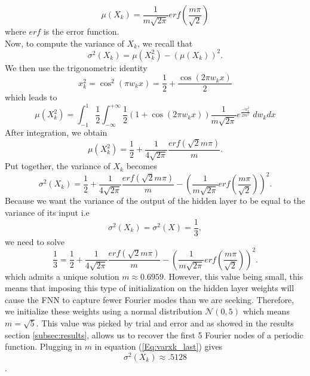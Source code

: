 \documentclass[AMS,STIX1COL]{WileyNJD-v2}
\begin{document}
\begin{enumerate}
\begin{equation}\label{Eq:muxk_last}
    \mu(X_k) = \frac{1}{m\sqrt{2\pi}}erf\left(\frac{m\pi}{\sqrt{2}}\right) 
\end{equation}
where $erf$ is the error function.\\
Now, to compute the variance of $X_k$, we recall that
$$\sigma^2(X_k) = \mu(X_k^2) - (\mu(X_k))^2.$$ 
We then use the trigonometric identity $$x_k^2 = \cos^2(\pi w_k x) = \frac{1}{2} + \frac{\cos(2\pi w_kx)}{2}$$ which leads to
\begin{equation*}
    \mu(X_k^2) = \int_{-1}^{1}\frac{1}{2} \int_{-\infty}^{+\infty} \frac{1}{2}(1 + \cos(2 \pi w_k x))\frac{1}{m \sqrt{2\pi}} e^{\frac{-w_k^2}{2m^2}}\; dw_k dx
\end{equation*}
After integration, we obtain 
$$\mu(X_k^2) = \frac{1}{2} + \frac{1}{4\sqrt{2\pi}}\frac{erf\left(\sqrt{2}m\pi\right)}{m}.$$
Put together, the variance of $X_k$ becomes
\begin{equation}\label{Eq:varxk_last}
    \sigma^2(X_k) = \frac{1}{2} + \frac{1}{4\sqrt{2\pi}}\frac{erf(\sqrt{2}m\pi)}{m}-\left(\frac{1}{m\sqrt{2\pi}}erf\left(\frac{m\pi}{\sqrt{2}}\right) \right)^2 .
\end{equation}
Because we want the variance of the output of the hidden layer to be equal to the variance of its input i.e $$\sigma^2(X_k) = \sigma^2(X) = \frac{1}{3}, $$ we need to solve 
\begin{equation*}
    \frac{1}{3} = \frac{1}{2} + \frac{1}{4\sqrt{2\pi}}\frac{erf(\sqrt{2}m\pi)}{m}-\left(\frac{1}{m\sqrt{2\pi}}erf\left(\frac{m\pi}{\sqrt{2}}\right) \right)^2 .
\end{equation*}
which admits a unique solution $m \approx 0.6959$. However, this value being small, this means that imposing this type of initialization on the hidden layer weights will cause the FNN to capture fewer Fourier modes than we are seeking. Therefore, we initialize these weights using a normal distribution $\mathcal N(0,5)$ which means $m = \sqrt{5}$. This value was picked by trial and error and as showed in the results section \ref{subsec:results}, allows us to recover the first 5 Fourier nodes of a periodic function. Plugging in $m$ in equation (\ref{Eq:varxk_last}) gives
$$\sigma^2(X_k) \approx .5128$$. 
    

\end{enumerate}
\end{document}

